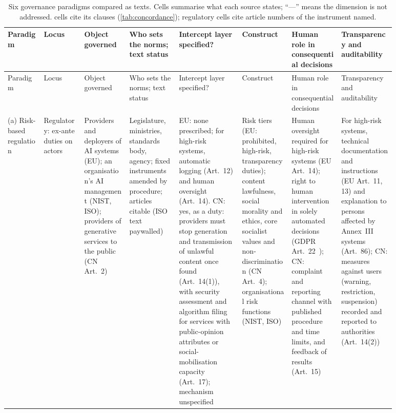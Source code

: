 \begingroup\scriptsize
\setlength{\tabcolsep}{3pt}
\renewcommand{\arraystretch}{1.1}
\begin{longtable}{@{}>{\raggedright\arraybackslash}p{0.08\linewidth}>{\raggedright\arraybackslash}p{0.095\linewidth}>{\raggedright\arraybackslash}p{0.10\linewidth}>{\raggedright\arraybackslash}p{0.115\linewidth}>{\raggedright\arraybackslash}p{0.14\linewidth}>{\raggedright\arraybackslash}p{0.11\linewidth}>{\raggedright\arraybackslash}p{0.115\linewidth}>{\raggedright\arraybackslash}p{0.125\linewidth}@{}}
\caption{Six governance paradigms compared as texts. Cells summarise what each source states; ``---'' means the dimension is not addressed. \pol{} cells cite its clauses (\cref{tab:concordance}); regulatory cells cite article numbers of the instrument named.}\label{tab:paradigms}\\
\toprule
Paradigm & Locus & Object governed & Who sets the norms; text status & Intercept layer specified? & Construct & Human role in consequential decisions & Transparency and auditability \\
\midrule
\endfirsthead
\toprule
Paradigm & Locus & Object governed & Who sets the norms; text status & Intercept layer specified? & Construct & Human role in consequential decisions & Transparency and auditability \\
\midrule
\endhead
\bottomrule
\endfoot
(a) Risk-based regulation~\cite{euaiact2024,nist2023airmf,iso42001,cac2023genai} & Regulatory: ex-ante duties on actors & Providers and deployers of AI systems (EU); an organisation's AI management (NIST, ISO); providers of generative services to the public (CN Art.~2) & Legislature, ministries, standards body, agency; fixed instruments amended by procedure; articles citable (ISO text paywalled) & EU: none prescribed; for high-risk systems, automatic logging (Art.~12) and human oversight (Art.~14). CN: yes, as a duty: providers must stop generation and transmission of unlawful content once found (Art.~14(1)), with security assessment and algorithm filing for services with public-opinion attributes or social-mobilisation capacity (Art.~17); mechanism unspecified & Risk tiers (EU: prohibited, high-risk, transparency duties); content lawfulness, social morality and ethics, core socialist values and non-discrimination (CN Art.~4); organisational risk functions (NIST, ISO) & Human oversight required for high-risk systems (EU Art.~14); right to human intervention in solely automated decisions (GDPR Art.~22~\cite{gdpr2016}); CN: complaint and reporting channel with published procedure and time limits, and feedback of results (Art.~15) & For high-risk systems, technical documentation and instructions (EU Art.~11, 13) and explanation to persons affected by Annex~III systems (Art.~86); CN: measures against users (warning, restriction, suspension) recorded and reported to authorities (Art.~14(2)) \\

\end{longtable}
